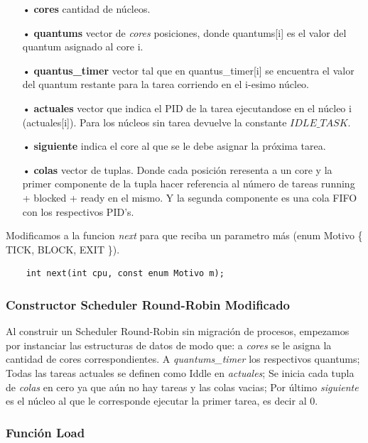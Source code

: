 \documentclass[a4paper]{article}
\begin{document}
	\begin{itemize}
	\item[•]\textbf{cores} cantidad de n\'ucleos.
	\item[•]\textbf{quantums} vector de \emph{cores} posiciones, donde quantums[i] es el valor del quantum asignado al core i.
	\item[•]\textbf{quantus_timer}  vector tal que en quantus_timer[i] se encuentra el valor del quantum restante para la tarea corriendo en el i-esimo núcleo.
	\item[•]\textbf{actuales} vector que indica el PID de la tarea ejecutandose en el núcleo i (actuales[i]). Para los núcleos sin tarea devuelve la constante $IDLE\_TASK$.
	\item[•]\textbf{siguiente} indica el core al que se le debe asignar la próxima tarea.
	\item[•]\textbf{colas} vector de tuplas. Donde cada posición reresenta a un core y la primer componente de la tupla hacer referencia al número de tareas running + blocked + ready en el mismo. Y la segunda componente es una cola FIFO con los respectivos PID's.  
	\end{itemize}	
	
\noindent  Modificamos a la funcion \emph{next} para que reciba un parametro m\'as (enum Motivo \{ TICK, BLOCK, EXIT \}).
	\begin{codesnippet}
	\begin{verbatim}
    int next(int cpu, const enum Motivo m);
	\end{verbatim}
	\end{codesnippet}
		
\subsubsection*{Constructor Scheduler Round-Robin Modificado}		

Al construir un Scheduler Round-Robin sin migración de procesos, empezamos por instanciar las estructuras de datos de modo que: a \emph{cores} se le asigna la cantidad de cores correspondientes. A \emph{quantums\_timer} los respectivos quantums; Todas las tareas actuales se definen como Iddle en \emph{actuales}; Se inicia cada tupla de \emph{colas} en cero ya que aún no hay tareas y las colas vacias; Por último \emph{siguiente} es el n\'ucleo al que le corresponde ejecutar la primer tarea, es decir al 0.

\subsubsection*{Funci\'on Load}
\end{document}
